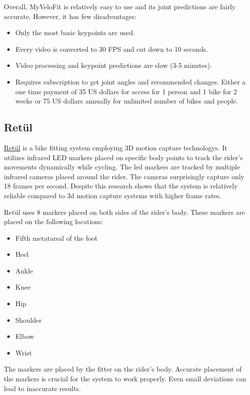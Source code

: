 Overall, MyVeloFit is relatively easy to use and its joint predictions are fairly accurate. However, it has few disadvantages:

\begin{itemize}
    \item Only the most basic keypoints are used.
    \item Every video is converted to 30 FPS and cut down to 10 seconds.
    \item Video processing and keypoint predictions are slow (3-5 minutes).
    \item Requires subscription to get joint angles and recommended changes. Either a one time payment of 35 US dollars for access for 1 person and 1 bike for 2 weeks or 75 US dollars annually for unlimited number of bikes and people.
\end{itemize}


\subsection{Retül}
\href{https://www.retul.com/}{Retül} is a bike fitting system employing 3D motion capture technologys. It utilizes infrared LED markers placed on specific body points to track the rider's movements dynamically while cycling. The led markers are tracked by multiple infrared cameras placed around the rider. The cameras surprisingly capture only 18 frames per second. Despite this research \cite{retulReliability} shows that the system is relatively reliable compared to 3d motion capture systems with higher frame rates.

Retül uses 8 markers placed on both sides of the rider's body. These markers are placed on the following locations:

\begin{itemize}
    \item Fifth metatarsal of the foot
    \item Heel
    \item Ankle
    \item Knee
    \item Hip
    \item Shoulder
    \item Elbow
    \item Wrist
\end{itemize}

The markers are placed by the fitter on the rider's body. Accurate placement of the markers is crucial for the system to work properly. Even small deviations can lead to inaccurate results.

